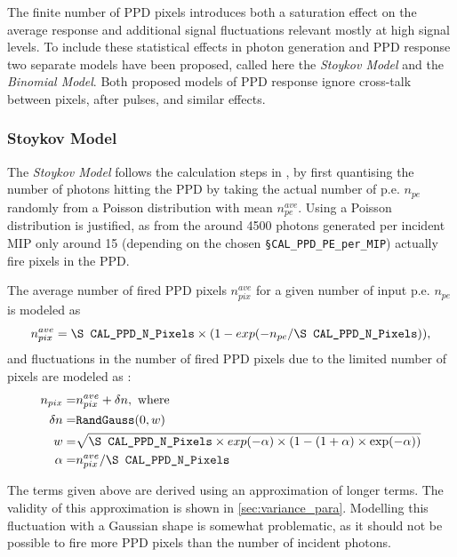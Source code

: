 \documentclass[12pt]{article} %
\begin{document}
The finite number of PPD pixels introduces both a saturation effect on the average response and additional signal fluctuations relevant mostly at high signal levels. 
To include these statistical effects in photon generation and PPD response two separate models have been proposed, called here the \emph{Stoykov Model} and the \emph{Binomial Model}. Both proposed models of PPD response ignore cross-talk between pixels, after pulses, and similar effects.

\subsubsection*{Stoykov Model}
The \emph{Stoykov Model} follows the calculation steps in \cite{PPD}, by first quantising the number of photons hitting the PPD by taking the actual number of p.e. $n_{pe}$ randomly from a Poisson distribution with mean $n_{pe}^{ave}$. Using a Poisson distribution is justified, as from the around 4500 photons generated per incident MIP \cite{JGU_LA} only around 15 (depending on the chosen {\tt \S CAL\_PPD\_PE\_per\_MIP}) actually fire pixels in the PPD.

The average number of fired PPD pixels ${n}_{pix}^{ave}$ for a given number of input p.e. $n_{pe}$ is modeled as
\begin{equation*}
{n}_{pix}^{ave} = \text{\tt \S CAL\_PPD\_N\_Pixels} \times ( 1 - exp ( -n_{pe} / \text{\tt \S CAL\_PPD\_N\_Pixels}  ) ), 
\end{equation*}
and fluctuations in the number of fired PPD pixels due to the limited number of pixels are modeled as \cite{PPD}:
\begin{equation*}
\begin{split}
n_{pix} = & {n}_{pix}^{ave} + \delta n, \text{ where} \\
\delta n = & \text{\tt RandGauss}( 0, w ) \\
       w = & \sqrt{\text{\tt \S CAL\_PPD\_N\_Pixels} \times exp(-\alpha) \times ( 1 - (1+\alpha) \times \exp ( - \alpha ) ) } \\
       \alpha = & n_{pix}^{ave} / \text{\tt \S CAL\_PPD\_N\_Pixels}
\end{split}
\end{equation*}

The terms given above are derived using an approximation of longer terms. The validity of this approximation is shown in \ref{sec:variance_para}.
Modelling this fluctuation with a Gaussian shape is somewhat problematic, as it should not be possible to fire more PPD pixels than the number of incident photons.
\end{document}
